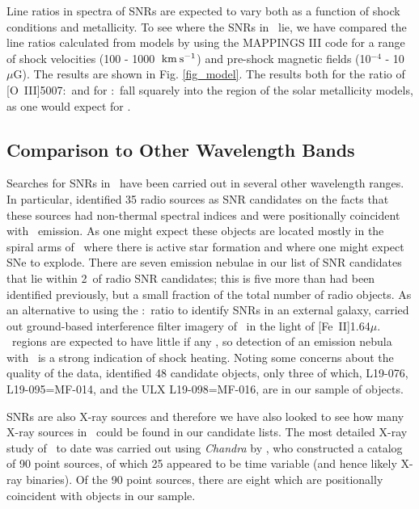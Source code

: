 Line ratios in spectra of SNRs are expected to vary both as a function of shock conditions and metallicity.  To see where the SNRs in \gal\ lie, we have compared the line ratios calculated from models by \cite{allen08} using the MAPPINGS III code for a range of shock velocities (100 - 1000 $\:{\rm km\:s^{-1}}$) and pre-shock magnetic fields (10$^{-4}$ - 10 $\mu$G).  The results are shown in Fig. \ref{fig_model}.  The results both for the ratio of [O~III]5007:\hb\ and for \sii:\ha\ fall squarely into the region of the solar metallicity models, as one would expect for \gal.

\subsection{Comparison to Other Wavelength Bands}


Searches for SNRs in \gal\ have been carried out in several other wavelength ranges.  In particular,  \cite{lacey01} identified 35 radio sources as SNR candidates on the facts that these sources had non-thermal spectral indices and were positionally coincident with \ha\ emission.  As one might expect these objects are located mostly in the spiral arms of \gal\ where there is active star formation and where one might expect SNe to explode.  There are seven emission nebulae in our list of SNR candidates that lie within 2\arcsec\ of radio SNR candidates; this is five more than had been identified previously, but a small fraction of the total number of radio objects.  As an alternative to using the \sii:\ha\ ratio to identify SNRs in an external galaxy, \cite{bruursema14}  carried out ground-based interference filter imagery of \gal\ in the light of [Fe~II]1.64$\mu$.  \hii\ regions are expected to have little if any \feii, so detection of an emission nebula with \feii\ is a strong indication of shock heating.  Noting some concerns about the quality of the data,  \cite{bruursema14}  identified 48 candidate objects, only three of which, L19-076, L19-095=MF-014, and the ULX L19-098=MF-016, are in our sample of objects.  

SNRs are also X-ray sources and therefore we have also looked to see how many X-ray sources in \gal\ could be found in our candidate lists.  The most detailed X-ray study of \gal\ to date was carried out using {\em Chandra} by \cite{fridriksson08}, who constructed a catalog of 90 point sources, of which 25 appeared to be time variable (and hence likely X-ray binaries).  Of the 90 point sources, there are eight which are positionally coincident with objects in our sample. 

